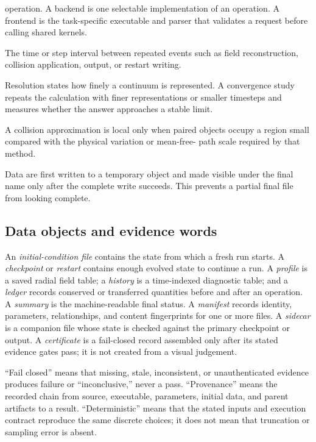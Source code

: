 \begin{description}
      operation.  A backend is one selectable implementation of an operation.
      A frontend is the task-specific executable and parser that validates a
      request before calling shared kernels.
\item[Cadence.] The time or step interval between repeated events such as
      field reconstruction, collision application, output, or restart writing.
\item[Resolution and convergence.] Resolution states how finely a continuum
      is represented.  A convergence study repeats the calculation with finer
      representations or smaller timesteps and measures whether the answer
      approaches a stable limit.
\item[Locality.] A collision approximation is local only when paired objects
      occupy a region small compared with the physical variation or mean-free-
      path scale required by that method.
\item[Atomic write.] Data are first written to a temporary object and made
      visible under the final name only after the complete write succeeds.
      This prevents a partial final file from looking complete.
\end{description}

\subsection{Data objects and evidence words}

An \emph{initial-condition file} contains the state from which a fresh run
starts.  A \emph{checkpoint} or \emph{restart} contains enough evolved state
to continue a run.  A \emph{profile} is a saved radial field table; a
\emph{history} is a time-indexed diagnostic table; and a \emph{ledger} records
conserved or transferred quantities before and after an operation.  A
\emph{summary} is the machine-readable final status.  A \emph{manifest}
records identity, parameters, relationships, and content fingerprints for one
or more files.  A \emph{sidecar} is a companion file whose state is checked
against the primary checkpoint or output.  A \emph{certificate} is a
fail-closed record assembled only after its stated evidence gates pass; it is
not created from a visual judgement.

``Fail closed'' means that missing, stale, inconsistent, or unauthenticated
evidence produces failure or ``inconclusive,'' never a pass.  ``Provenance''
means the recorded chain from source, executable, parameters, initial data,
and parent artifacts to a result.  ``Deterministic'' means that the stated
inputs and execution contract reproduce the same discrete choices; it does
not mean that truncation or sampling error is absent.

